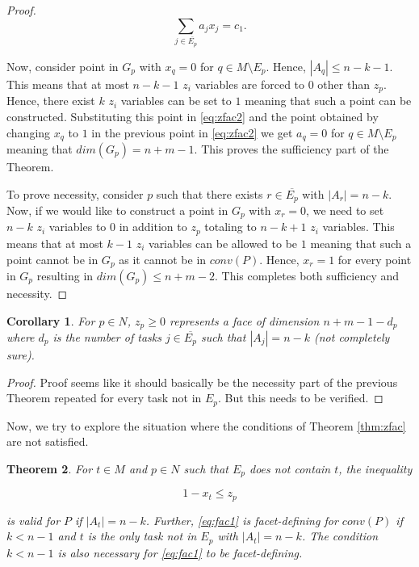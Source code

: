 \documentclass[12pt]{article}
\renewcommand{\v}[1]{\overline{#1}}
\newtheorem{thm}{Theorem}
\newtheorem{cor}[thm]{Corollary}
\begin{document}
\begin{proof}
\begin{equation} \label{eq:zfac3}
\sum_{j \in \v{E_p}} a_j x_j = c_1.
\end{equation}

Now, consider point in $G_p$ with $x_q = 0$ for $q \in M \setminus E_p$. Hence, $|A_q| \leq n - k - 1$. This means that at most $n-k-1$ $z_i$ variables are forced to $0$ other than $z_p$. Hence, there exist $k$ $z_i$ variables can be set to $1$ meaning that such a point can be constructed. Substituting this point in \eqref{eq:zfac2} and the point obtained by changing $x_q$ to $1$ in the previous point in \eqref{eq:zfac2} we get $a_q = 0$ for $q \in M \setminus E_p$ meaning that $dim(G_p) = n+m-1$. This proves the sufficiency part of the Theorem.

To prove necessity, consider $p$ such that there exists $r \in \v{E_p}$ with $|A_r| = n-k$. Now, if we would like to construct a point in $G_p$ with $x_r = 0$, we need to set $n-k$ $z_i$ variables to $0$ in addition to $z_p$ totaling to $n-k+1$ $z_i$ variables. This means that at most $k-1$ $z_i$ variables can be allowed to be $1$ meaning that such a point cannot be in $G_p$ as it cannot be in $conv(P)$. Hence, $x_r = 1$ for every point in $G_p$ resulting in $dim(G_p) \leq n+m-2$. This completes both sufficiency and necessity.
\end{proof}

\begin{cor}
For $p \in N$, $z_p \geq 0$ represents a face of dimension $n+m-1-d_p$ where $d_p$ is the number of tasks $j \in \v{E_p}$ such that $|A_j| = n-k$ (not completely sure).
\end{cor}

\begin{proof}
Proof seems like it should basically be the necessity part of the previous Theorem repeated for every task not in $E_p$. But this needs to be verified.
\end{proof}

Now, we try to explore the situation where the conditions of Theorem \ref{thm:zfac} are not satisfied.

\begin{thm} \label{thm:facet1}
For $t \in M$ and $p \in N$ such that $E_p$ does not contain $t$, the inequality 

\begin{equation} \label{eq:fac1}
1 - x_t \leq z_p
\end{equation}

is valid for $P$ if $|A_t| = n-k$. Further, \eqref{eq:fac1} is facet-defining for $conv(P)$ if
$k < n-1$ and $t$ is the only task not in $E_p$ with $|A_t| = n-k$. The condition $k < n-1$ is also necessary for \eqref{eq:fac1} to be facet-defining.
\end{thm}
\end{document}
